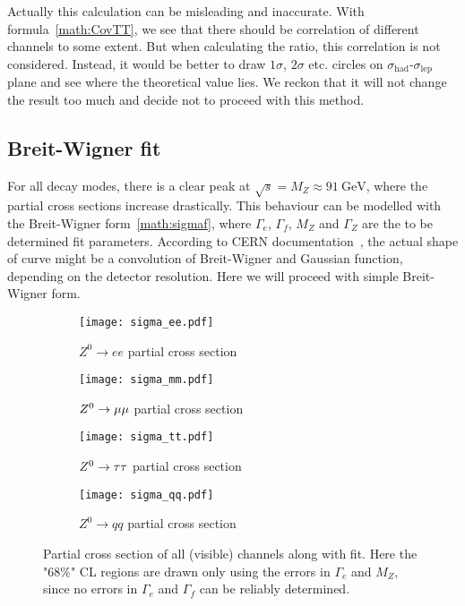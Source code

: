 Actually this calculation can be misleading and inaccurate. With formula~\ref{math:CovTT}, we see that there should be correlation of different channels to some extent. But when calculating the ratio, this correlation is not considered. Instead, it would be better to draw $1\sigma$, $2\sigma$ etc. circles on $\sigma_\text{had}$-$\sigma_\text{lep}$ plane and see where the theoretical value lies. We reckon that it will not change the result too much and decide not to proceed with this method.

\subsection{Breit-Wigner fit}
For all decay modes, there is a clear peak at $\sqrt{s} = M_Z \approx \SI{91}{\giga\eV}$, where the partial cross sections increase drastically. This behaviour can be modelled with the Breit-Wigner form~\ref{math:sigmaf}, where $\Gamma_e$, $\Gamma_f$, $M_Z$ and $\Gamma_Z$ are the to be determined fit parameters. According to CERN documentation~\cite{cms}, the actual shape of curve might be a convolution of Breit-Wigner and Gaussian function, depending on the detector resolution. Here we will proceed with simple Breit-Wigner form.
\begin{figure}[ht]
	\centering
	\begin{subfigure}[b]{0.5\textwidth}
	\begin{center}
	\texttt{[image: sigma\_ee.pdf]}%
	\end{center}
	\caption{$Z^0 \rightarrow ee$ partial cross section}
	\end{subfigure}%
	\begin{subfigure}[b]{0.5\textwidth}
	\begin{center}
	\texttt{[image: sigma\_mm.pdf]}
	\end{center}
	\caption{$Z^0 \rightarrow \mu\mu$ partial cross section}
	\end{subfigure}
	\begin{subfigure}[b]{0.5\textwidth}
	\begin{center}
	\texttt{[image: sigma\_tt.pdf]}%
	\end{center}
	\caption{$Z^0 \rightarrow \tau\tau$ partial cross section}
	\end{subfigure}%
	\begin{subfigure}[b]{0.5\textwidth}
	\begin{center}
	\texttt{[image: sigma\_qq.pdf]}
	\end{center}
	\caption{$Z^0 \rightarrow qq$ partial cross section}
	\end{subfigure}
	\caption{Partial cross section of all (visible) channels along with fit. Here the "$68\%$" CL regions are drawn only using the errors in $\Gamma_e$ and $M_Z$, since no errors in $\Gamma_e$ and $\Gamma_f$ can be reliably determined.}%
	\label{fig:p_cross_fit}
\end{figure}	

